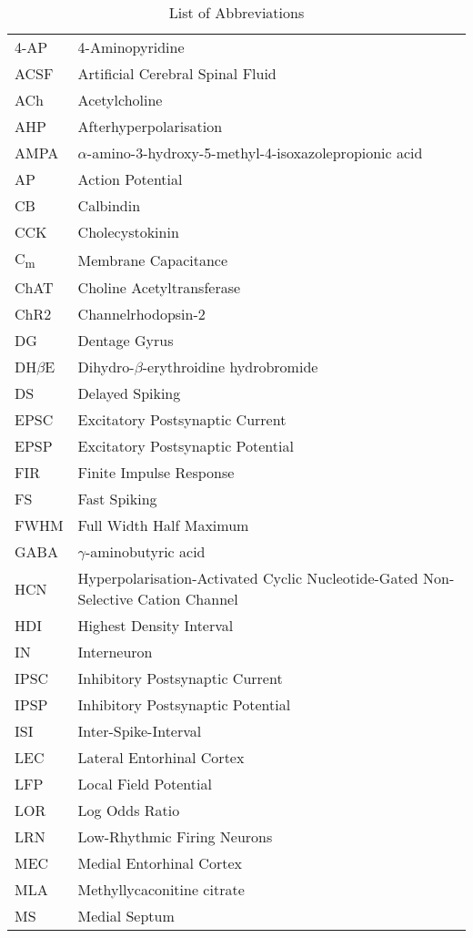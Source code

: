 \documentclass[
  12pt,
  a4paper,
  openany]{book}
\begin{document}
\begin{longtable}[]{@{}ll@{}}
\caption{List of Abbreviations}\tabularnewline
\toprule
\endhead
4-AP & 4-Aminopyridine \\
ACSF & Artificial Cerebral Spinal Fluid \\
ACh & Acetylcholine \\
AHP & Afterhyperpolarisation \\
AMPA & \(\alpha\)-amino-3-hydroxy-5-methyl-4-isoxazolepropionic acid \\
AP & Action Potential \\
CB & Calbindin \\
CCK & Cholecystokinin \\
C\textsubscript{m} & Membrane Capacitance \\
ChAT & Choline Acetyltransferase \\
ChR2 & Channelrhodopsin-2 \\
DG & Dentage Gyrus \\
DH\(\beta\)E & Dihydro-\(\beta\)-erythroidine hydrobromide \\
DS & Delayed Spiking \\
EPSC & Excitatory Postsynaptic Current \\
EPSP & Excitatory Postsynaptic Potential \\
FIR & Finite Impulse Response \\
FS & Fast Spiking \\
FWHM & Full Width Half Maximum \\
GABA & \(\gamma\)-aminobutyric acid \\
HCN & Hyperpolarisation-Activated Cyclic Nucleotide-Gated Non-Selective Cation Channel \\
HDI & Highest Density Interval \\
IN & Interneuron \\
IPSC & Inhibitory Postsynaptic Current \\
IPSP & Inhibitory Postsynaptic Potential \\
ISI & Inter-Spike-Interval \\
LEC & Lateral Entorhinal Cortex \\
LFP & Local Field Potential \\
LOR & Log Odds Ratio \\
LRN & Low-Rhythmic Firing Neurons \\
MEC & Medial Entorhinal Cortex \\
MLA & Methyllycaconitine citrate \\
MS & Medial Septum \\

\end{longtable}
\end{document}
